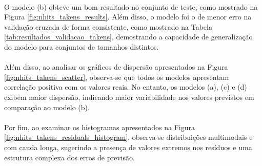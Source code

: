 \paragraph{} O modelo (b) obteve um bom resultado no conjunto de teste, como mostrado na Figura \ref{fig:nhits_takens_results}. Além disso, o modelo foi o de menor erro na validação cruzada de forma consistente, como mostrado na Tabela \ref{tab:resultados_validacao_takens}, demostrando a capacidade de generalização do modelo para conjuntos de tamanhos distintos.
\paragraph{} Além disso, ao analisar os gráficos de dispersão apresentados na Figura \ref{fig:nhits_takens_scatter}, observa-se que todos os modelos apresentam correlação positiva com os valores reais. No entanto, os modelos (a), (c) e (d) exibem maior dispersão, indicando maior variabilidade nos valores previstos em comparação ao modelo (b).
\paragraph{} Por fim, ao examinar os histogramas apresentados na Figura \ref{fig:nhits_takens_residuals_histogram}, observa-se distribuições multimodais e com cauda longa, sugerindo a presença de valores extremos nos resíduos e uma estrutura complexa dos erros de previsão.

